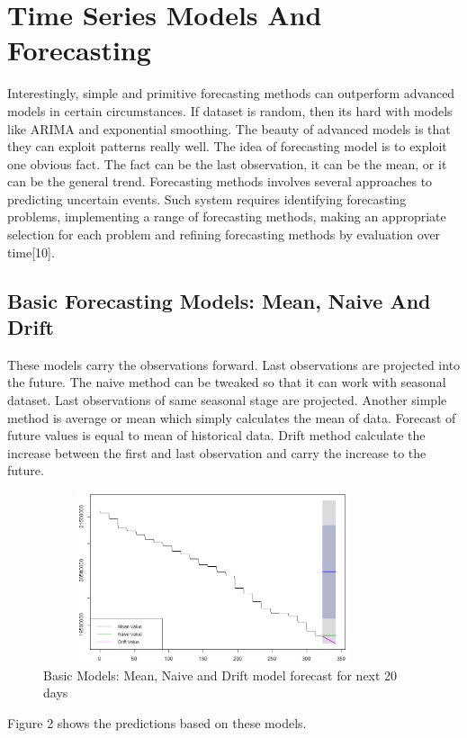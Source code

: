 \documentclass[runningheads]{llncs}
\begin{document}
\section{Time Series Models And Forecasting}
Interestingly, simple and primitive forecasting methods can outperform advanced models in certain circumstances. If dataset is random, then its hard with models like ARIMA and exponential smoothing. The beauty of advanced models is that they can exploit patterns really well. The idea of forecasting model is to exploit one obvious fact. The fact can be the last observation, it can be the mean, or it can be the general trend.
\linebreak
Forecasting methods involves several approaches to predicting uncertain events. Such system requires identifying forecasting problems, implementing a range of forecasting methods, making an appropriate selection for each problem and refining forecasting methods by evaluation over time[10].

\subsection{Basic Forecasting Models: Mean, Naive And Drift}
These models carry the observations forward. Last observations are projected into the future. The naive method can be tweaked so that it can work with seasonal dataset. Last observations of same seasonal stage are projected. Another simple method is average or mean which simply calculates the mean of data. Forecast of future values is equal to mean of historical data. Drift method calculate the increase between the first and last observation and carry the increase to the future.
\begin{figure}
\centering
\includegraphics[scale=1,width=10cm,height=5cm]{BasicModelsNew.png}
\caption{Basic Models: Mean, Naive and Drift model forecast for next 20 days}
\end{figure}
Figure 2 shows the predictions based on these models.
\end{document}
